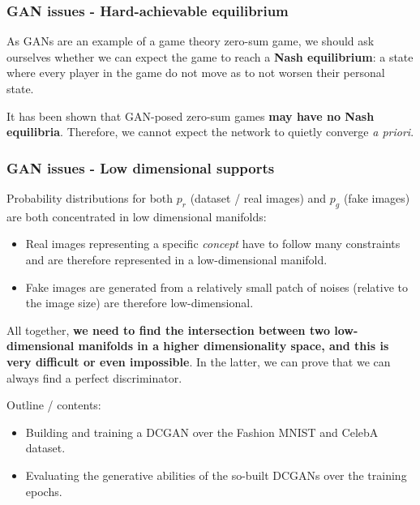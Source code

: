 \begin{frame}
    \frametitle{GAN issues - Hard-achievable equilibrium}
    As GANs are an example of a game theory zero-sum game, we should ask ourselves whether we can expect the game to reach a \textbf{Nash equilibrium}: a state where every player in the game do not move as to not worsen their personal state.

    It has been shown that GAN-posed zero-sum games \textbf{may have no Nash equilibria}. Therefore, we cannot expect the network to quietly converge \emph{a priori}.
\end{frame}

\begin{frame}
    \frametitle{GAN issues - Low dimensional supports}
    Probability distributions for both $p_r$ (dataset / real images) and $p_g$ (fake images) are both concentrated in low dimensional manifolds:
    \begin{itemize}
        \item Real images representing a specific \emph{concept} have to follow many constraints and are therefore represented in a low-dimensional manifold.
        \item Fake images are generated from a relatively small patch of noises (relative to the image size) are therefore low-dimensional.
    \end{itemize}
    All together, \textbf{we need to find the intersection between two low-dimensional manifolds in a higher dimensionality space, and this is very difficult or even impossible}. In the latter, we can prove that we can always find a perfect discriminator.
\end{frame}

\begin{colab}
    Outline / contents:
    \begin{itemize}
        \item Building and training a DCGAN over the Fashion MNIST and CelebA dataset.
        \item Evaluating the generative abilities of the so-built DCGANs over the training epochs.
    \end{itemize}
\end{colab}

